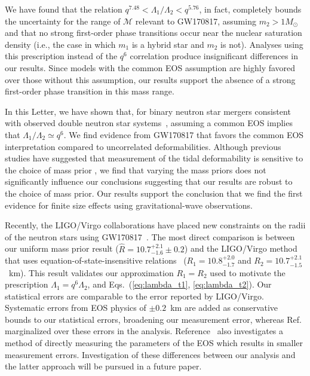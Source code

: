 We have found that the relation $q^{7.48} < \Lambda_1/\Lambda_2 < q^{5.76}$, in fact, completely bounds the uncertainty for the range of $\mathcal{M}$ relevant to GW170817, assuming $m_2 > 1M_\odot$ \cite{Zhao:2018nyf} and that no strong first-order phase transitions occur near the nuclear saturation density (i.e., the case in which $m_1$ is a hybrid star and $m_2$ is not). Analyses using this prescription instead of the $q^6$ correlation produce insignificant differences in our results. Since models with the common EOS assumption are highly favored over those without this assumption, our results support the absence of a strong first-order phase transition in this mass range.

In this Letter, we have shown that, for binary neutron star mergers consistent with observed double neutron star systems~\cite{Tauris:2017omb}, assuming a common EOS implies that $\Lambda_1 / \Lambda_2 \simeq q^6$. We find evidence from GW170817 that favors the common EOS interpretation compared to uncorrelated deformabilities. Although previous studies have suggested that measurement of the tidal deformability is sensitive to the choice of mass prior \cite{Agathos:2015uaa}, we find that varying the mass priors does not significantly influence our conclusions suggesting that our results are robust to the choice of mass prior. Our results support the conclusion that we find the first evidence for finite size effects using gravitational-wave observations. 

Recently, the LIGO/Virgo collaborations have placed new constraints on the radii of the neutron stars using GW170817~\cite{Abbott:2018exr}. The most direct comparison is between our uniform mass prior result ($\hat R = 10.7^{+2.1}_{-1.6} \pm 0.2$) and the LIGO/Virgo method that uses equation-of-state-insensitive relations~\cite{Yagi:2016qmr,Chatziioannou:2018vzf} ($R_1 = 10.8^{+2.0}_{-1.7}$ and $R_2 = 10.7^{+2.1}_{-1.5}$~km). This result validates our approximation $R_1=R_2$ used to motivate the prescription $\Lambda_1=q^6\Lambda_2$, and Eqs.~(\ref{eq:lambda_t1}, \ref{eq:lambda_t2}). Our statistical errors are comparable to the error reported by LIGO/Virgo. Systematic errors from EOS physics of $\pm 0.2$~km are added as conservative bounds to our statistical errors, broadening our measurement error, whereas Ref.~\cite{Abbott:2018exr} marginalized over these errors in the analysis. Reference~\cite{Abbott:2018exr} also investigates a method of directly measuring the parameters of the EOS which results in smaller measurement errors. Investigation of these differences between our analysis and the latter approach will be pursued in a future paper. 

